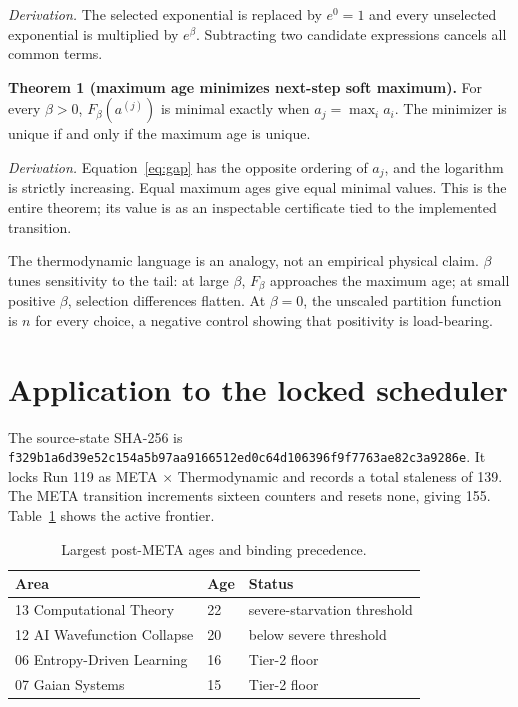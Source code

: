 \documentclass[10pt]{article}
\begin{document}
\emph{Derivation.}  The selected exponential is replaced by $e^0=1$ and
every unselected exponential is multiplied by $e^\beta$.  Subtracting two
candidate expressions cancels all common terms.

\textbf{Theorem 1 (maximum age minimizes next-step soft maximum).}
For every $\beta>0$, $F_\beta(a^{(j)})$ is minimal exactly when
$a_j=\max_i a_i$.  The minimizer is unique if and only if the maximum age is
unique.

\emph{Derivation.}  Equation~\eqref{eq:gap} has the opposite ordering of
$a_j$, and the logarithm is strictly increasing.  Equal maximum ages give equal
minimal values.  This is the entire theorem; its value is as an inspectable
certificate tied to the implemented transition.

The thermodynamic language is an analogy, not an empirical physical claim.
$\beta$ tunes sensitivity to the tail: at large $\beta$, $F_\beta$ approaches
the maximum age; at small positive $\beta$, selection differences flatten.  At
$\beta=0$, the unscaled partition function is $n$ for every choice, a negative
control showing that positivity is load-bearing.

\section{Application to the locked scheduler}

The source-state SHA-256 is
\texttt{f329b1a6d39e52c154a5b97aa9166512ed0c64d106396f9f7763ae82c3a9286e}.
It locks Run 119 as META $\times$ Thermodynamic and records a total staleness of
139.  The META transition increments sixteen counters and resets none, giving
155.  Table~\ref{tab:ages} shows the active frontier.

\begin{table}[h]
\centering
\small
\caption{Largest post-META ages and binding precedence.}
\label{tab:ages}
\begin{tabular}{lll}
\toprule
Area & Age & Status \\
\midrule
13 Computational Theory & 22 & severe-starvation threshold \\
12 AI Wavefunction Collapse & 20 & below severe threshold \\
06 Entropy-Driven Learning & 16 & Tier-2 floor \\
07 Gaian Systems & 15 & Tier-2 floor \\
\bottomrule
\end{tabular}
\end{table}
\end{document}
